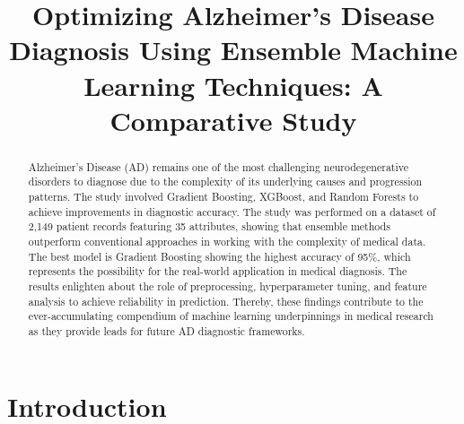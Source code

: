 \documentclass[conference]{IEEEtran} %
\begin{document}
\title{Optimizing Alzheimer’s Disease Diagnosis Using Ensemble Machine Learning Techniques: A Comparative Study}
\titlerunning{ } %


%
\maketitle              %
%
\begin{abstract}

Alzheimer’s Disease (AD) remains one of the most challenging neurodegenerative disorders to diagnose due to the complexity of its underlying causes and progression patterns. The study involved Gradient Boosting, XGBoost, and Random Forests to achieve improvements in diagnostic accuracy. The study was performed on a dataset of 2,149 patient records featuring 35 attributes, showing that ensemble methods outperform conventional approaches in working with the complexity of medical data. The best model is Gradient Boosting showing the highest accuracy of 95\%, which represents the possibility for the real-world application in medical diagnosis. The results enlighten about the role of preprocessing, hyperparameter tuning, and feature analysis to achieve reliability in prediction. Thereby, these findings contribute to the ever-accumulating compendium of machine learning underpinnings in medical research as they provide leads for future AD diagnostic frameworks.

\keywords{ }
\end{abstract}
%
%
%
\section{Introduction}
\end{document}
